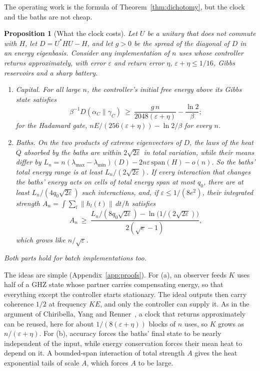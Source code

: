 \documentclass[11pt]{article}
\newtheorem{proposition}[theorem]{Proposition}
\theoremstyle{definition}
\theoremstyle{remark}
\begin{document}
The operating work is the formula of Theorem~\ref{thm:dichotomy}, but the clock and the baths are not cheap.

\begin{proposition}[What the clock costs]\label{prop:clockcost}
Let $U$ be a unitary that does not commute with $H$, let $D=U^*HU-H$, and let $g>0$ be the spread of the diagonal of $D$ in an energy eigenbasis. Consider any implementation of $n$ uses whose controller returns approximately, with error $\varepsilon$ and return error $\eta$, $\varepsilon+\eta\le1/16$, Gibbs reservoirs and a sharp battery.
\begin{enumerate}[label=(\alph*)]
\item \emph{Capital.} For all large $n$, the controller's initial free energy above its Gibbs state satisfies
\[
\beta^{-1}D(\alpha_C\|\gamma_C)\ \ge\ \frac{g\,n}{2048(\varepsilon+\eta)}-\frac{\ln2}\beta;
\]
for the Hadamard gate, $nE/(256(\varepsilon+\eta))-\ln2/\beta$ for every $n$.
\item \emph{Baths.} On the two products of extreme eigenvectors of $D$, the laws of the heat $Q$ absorbed by the baths are within $2\sqrt{2\varepsilon}$ in total variation, while their means differ by $L_n=n(\lambda_{\max}-\lambda_{\min})(D)-2n\varepsilon\,\mathrm{span}(H)-o(n)$. So the baths' total energy range is at least $L_n/(2\sqrt{2\varepsilon})$. If every interaction that changes the baths' energy acts on cells of total energy span at most $q_0$, there are at least $L_n/(4q_0\sqrt{2\varepsilon})$ such interactions, and, if $\varepsilon\le1/(8e^2)$, their integrated strength $A_n=\int\sum_l\|h_l(t)\|\,dt/\hbar$ satisfies
\[
A_n\ \ge\ \frac{L_n/(8q_0\sqrt{2\varepsilon})-\ln\bigl(1/(2\sqrt{2\varepsilon})\bigr)}{2(\sqrt e-1)},
\]
which grows like $n/\sqrt\varepsilon$.
\end{enumerate}
Both parts hold for batch implementations too.
\end{proposition}

The ideas are simple (Appendix~\ref{app:proofs}). For (a), an observer feeds $K$ uses half of a GHZ state whose partner carries compensating energy, so that everything except the controller starts stationary. The ideal outputs then carry coherence $1/2$ at frequency $KE$, and only the controller can supply it. As in the argument of Chiribella, Yang and Renner~\cite{ChiribellaYangRenner21}, a clock that returns approximately can be reused, here for about $1/(8(\varepsilon+\eta))$ blocks of $n$ uses, so $K$ grows as $n/(\varepsilon+\eta)$. For (b), accuracy forces the baths' final state to be nearly independent of the input, while energy conservation forces their mean heat to depend on it. A bounded-span interaction of total strength $A$ gives the heat exponential tails of scale $A$, which forces $A$ to be large.
\end{document}
